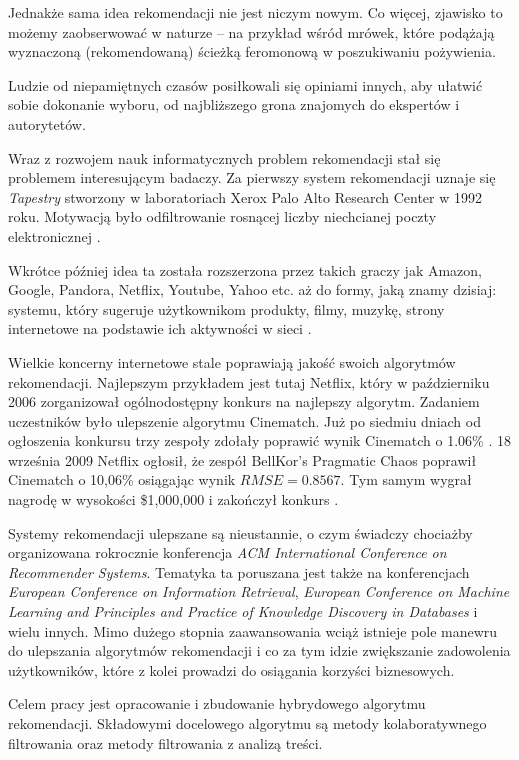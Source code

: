 \documentclass[twoside]{iisthesis}
\begin{document}
	 Jednakże sama idea rekomendacji nie jest niczym nowym. Co więcej, zjawisko to możemy zaobserwować w naturze -- na przykład wśród mrówek, które podążają wyznaczoną (rekomendowaną) ścieżką feromonową w poszukiwaniu pożywienia.
	 
	 Ludzie od niepamiętnych czasów posiłkowali się opiniami innych, aby ułatwić sobie dokonanie wyboru, od najbliższego grona znajomych do ekspertów i autorytetów.
	 
	 Wraz z rozwojem nauk informatycznych problem rekomendacji stał się problemem interesującym badaczy. Za pierwszy system rekomendacji uznaje się \textit{Tapestry} stworzony w laboratoriach Xerox Palo Alto Research Center w 1992 roku. Motywacją było odfiltrowanie rosnącej liczby niechcianej poczty elektronicznej \cite{id:FromTapestryToSVD}.
	 
	 Wkrótce później idea ta została rozszerzona przez takich graczy jak Amazon, Google, Pandora, Netflix, Youtube, Yahoo etc. aż do formy, jaką znamy dzisiaj: systemu, który sugeruje użytkownikom produkty, filmy, muzykę, strony internetowe na podstawie ich aktywności w sieci \cite{id:EvolutionOfRecommenderSystems}. 
	 
	 Wielkie koncerny internetowe stale poprawiają jakość swoich algorytmów rekomendacji. Najlepszym przykładem jest tutaj Netflix, który w październiku 2006 zorganizował ogólnodostępny konkurs na najlepszy algorytm. Zadaniem uczestników było ulepszenie algorytmu Cinematch. Już po siedmiu dniach od ogłoszenia konkursu trzy zespoły zdołały poprawić wynik Cinematch o 1.06\% \cite{id:NetflixPrize,id:NetflixPrizeRankings}. 18 września 2009 Netflix ogłosił, że zespół BellKor's Pragmatic Chaos poprawił Cinematch o 10,06\% osiągając wynik $RMSE = 0.8567$. Tym samym wygrał nagrodę w wysokości \$1,000,000 i zakończył konkurs \cite{id:NetflixPrize2,id:NetflixPrizeRules}.
	 
	 Systemy rekomendacji ulepszane są nieustannie, o czym świadczy chociażby organizowana rokrocznie konferencja\textit{ ACM International Conference on Recommender Systems}. Tematyka ta poruszana jest także na konferencjach \textit{European Conference on Information Retrieval}, \textit{European Conference on Machine Learning and Principles and Practice of Knowledge Discovery in Databases} i wielu innych. Mimo dużego stopnia zaawansowania wciąż istnieje pole manewru do ulepszania algorytmów rekomendacji i co za tym idzie zwiększanie zadowolenia użytkowników, które z kolei prowadzi do osiągania korzyści biznesowych.
	 
	 Celem pracy jest opracowanie i zbudowanie hybrydowego algorytmu rekomendacji. Składowymi docelowego algorytmu są metody kolaboratywnego filtrowania oraz metody filtrowania z analizą treści.  
	 
\end{document}
